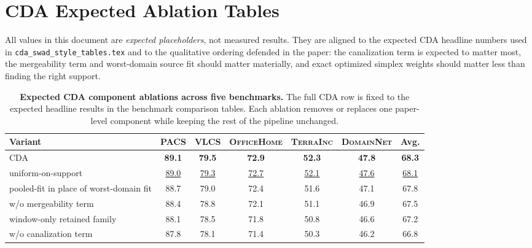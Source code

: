 \documentclass[10pt]{article}
\newcommand{\data}[1]{\textsc{#1}}
\newcommand{\Expected}[1]{#1}
\newcommand{\Best}[1]{\textbf{\Expected{#1}}}
\newcommand{\Second}[1]{\underline{\Expected{#1}}}
\begin{document}
\section*{CDA Expected Ablation Tables}

All values in this document are \emph{expected placeholders}, not measured results.
They are aligned to the expected CDA headline numbers used in
\texttt{cda\_swad\_style\_tables.tex} and to the qualitative ordering defended in the
paper: the canalization term is expected to matter most, the mergeability term and
worst-domain source fit should matter materially, and exact optimized simplex weights
should matter less than finding the right support.

\begin{table}[H]
\centering
\small
\caption{\textbf{Expected CDA component ablations across five benchmarks.} The full CDA row is fixed to the expected headline results in the benchmark comparison tables. Each ablation removes or replaces one paper-level component while keeping the rest of the pipeline unchanged.}
\label{tab:cda_component_ablations_all}
\setlength{\tabcolsep}{5pt}
\begin{tabular}{lccccc|c}
\toprule
\textbf{Variant} & \data{PACS} & \data{VLCS} & \data{OfficeHome} & \data{TerraInc} & \data{DomainNet} & \textbf{Avg.} \\
\midrule
CDA & \Best{89.1} & \Best{79.5} & \Best{72.9} & \Best{52.3} & \Best{47.8} & \Best{68.3} \\
uniform-on-support & \Second{89.0} & \Second{79.3} & \Second{72.7} & \Second{52.1} & \Second{47.6} & \Second{68.1} \\
pooled-fit in place of worst-domain fit & \Expected{88.7} & \Expected{79.0} & \Expected{72.4} & \Expected{51.6} & \Expected{47.1} & \Expected{67.8} \\
w/o mergeability term & \Expected{88.4} & \Expected{78.8} & \Expected{72.1} & \Expected{51.1} & \Expected{46.9} & \Expected{67.5} \\
window-only retained family & \Expected{88.1} & \Expected{78.5} & \Expected{71.8} & \Expected{50.8} & \Expected{46.6} & \Expected{67.2} \\
w/o canalization term & \Expected{87.8} & \Expected{78.1} & \Expected{71.4} & \Expected{50.3} & \Expected{46.2} & \Expected{66.8} \\
\bottomrule
\end{tabular}
\end{table}
\end{document}
